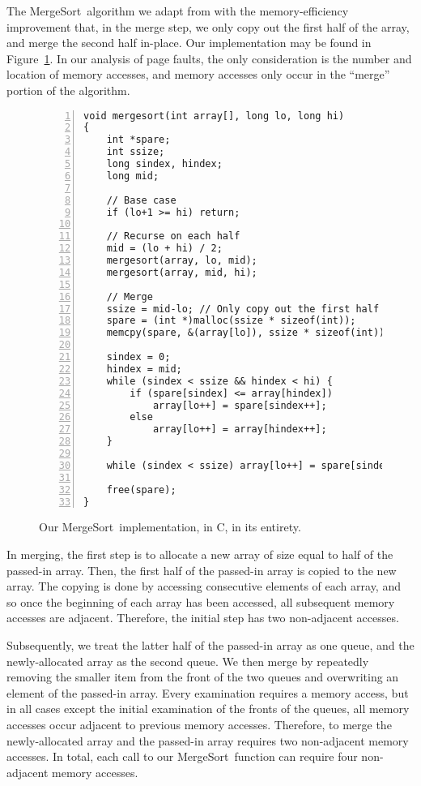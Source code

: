 \documentclass{acmtrans2m}
\newcommand{\mergesort}{{\sc MergeSort}}
\begin{document}
The \mergesort\ algorithm we adapt from  with the memory-efficiency
improvement that, in the merge step, we only copy out the first half of the
array, and merge the second half in-place.  Our implementation may be found in
Figure~\ref{fig:msort}.  In our analysis of page faults, the only consideration
is the number and location of memory accesses, and memory accesses only occur
in the ``merge'' portion of the algorithm.

\begin{figure}
{\footnotesize
\begin{Verbatim}[numbers=left,numbersep=3pt,xleftmargin=20pt]
void mergesort(int array[], long lo, long hi)
{
    int *spare;
    int ssize;
    long sindex, hindex;
    long mid;

    // Base case
    if (lo+1 >= hi) return; 

    // Recurse on each half
    mid = (lo + hi) / 2;  
    mergesort(array, lo, mid);
    mergesort(array, mid, hi);

    // Merge
    ssize = mid-lo; // Only copy out the first half
    spare = (int *)malloc(ssize * sizeof(int));
    memcpy(spare, &(array[lo]), ssize * sizeof(int));

    sindex = 0;
    hindex = mid;
    while (sindex < ssize && hindex < hi) {
        if (spare[sindex] <= array[hindex])
            array[lo++] = spare[sindex++];
        else
            array[lo++] = array[hindex++];
    }

    while (sindex < ssize) array[lo++] = spare[sindex++];

    free(spare);
}
\end{Verbatim}
}

\caption{Our \mergesort\ implementation, in C, in its entirety.}
\label{fig:msort}
\end{figure}

In merging, the first step is to allocate a new array of size equal to half of
the passed-in array.  Then, the first half of the passed-in array is copied to
the new array.  The copying is done by accessing consecutive elements of each
array, and so once the beginning of each array has been accessed, all
subsequent memory accesses are adjacent.  Therefore, the initial step has two
non-adjacent accesses.

Subsequently, we treat the latter half of the passed-in array as one queue, and
the newly-allocated array as the second queue.  We then merge by repeatedly
removing the smaller item from the front of the two queues and overwriting an
element of the passed-in array.  Every examination requires a memory access,
but in all cases except the initial examination of the fronts of the queues,
all memory accesses occur adjacent to previous memory accesses.  Therefore, to
merge the newly-allocated array and the passed-in array requires two
non-adjacent memory accesses.  In total, each call to our \mergesort\ function
can require four non-adjacent memory accesses.
\end{document}
